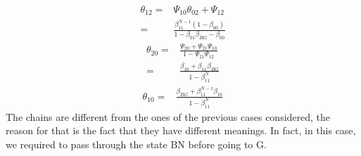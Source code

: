 \begin{equation*}
	\begin{split}
		\theta_{12} = & \Psi_{10}\theta_{02}+\Psi_{12}\\
		= & \frac{\beta_{11}^{N-1}(1-\beta_{00})}{1- \beta_{01}\beta_{BG}-\beta_{00}}
	\end{split}
\end{equation*}
\begin{equation*}
	\begin{split}
		\theta_{20} = & \frac{\Psi_{20}+\Psi_{21}\Psi_{10}}{1 - \Psi_{21}\Psi_{12}}\\
		= & \frac{\beta_{10}+ \beta_{11}\beta_{BG}}{1- \beta_{11}^N}
	\end{split}
\end{equation*}
\begin{equation*}
	\begin{split}
		\theta_{10} = & \frac{\beta_{BG} + \beta_{11}^{N-1}\beta_{10}}{1- \beta_{11}^N}
	\end{split}
\end{equation*}
The chains are different from the ones of the previous cases considered, the reason for that is the fact that they have different meanings. In fact, in this case, we required to pass through the state BN before going to G.
